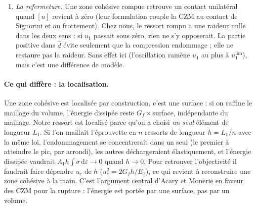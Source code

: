 \documentclass[11pt,a4paper]{article}
\newcommand{\dd}{\mathrm{d}}
\newcommand{\uc}{u_c}
\begin{document}
\begin{enumerate}[nosep]
        intrinsèques sont moins stables que les extrinsèques, parce que la décharge élastique
        du volume s'ajoute à l'adoucissement de l'interface. Notre ressort est donc \emph{plus}
        sujet au snap-back qu'une zone cohésive extrinsèque de mêmes paramètres.
  \item \emph{La refermeture.} Une zone cohésive rompue retrouve un contact unilatéral quand
        $[u]$ revient à zéro (leur formulation couple la CZM au contact de Signorini et au
        frottement). Chez nous, le ressort rompu a une raideur nulle dans les deux sens : si
        $u_1$ passait sous zéro, rien ne s'y opposerait. La partie positive dans $\hat d$ évite
        seulement que la compression endommage ; elle ne restaure pas la raideur. Sans effet
        ici (l'oscillation ramène $u_1$ au plus à $u_1^{\lim}$), mais c'est une différence de
        modèle.
\end{enumerate}

\paragraph{Ce qui diffère : la localisation.} Une zone cohésive est localisée par
construction, c'est une surface : si on raffine le maillage du volume, l'énergie dissipée
reste $G_f\times$surface, indépendante du maillage. Notre ressort est localisé parce qu'on a
choisi \emph{un seul} élément de longueur $L_1$. Si l'on maillait l'éprouvette en $n$
ressorts de longueur $h = L_1/n$ avec la même loi, l'endommagement se concentrerait dans un
seul (le premier à atteindre le pic, par arrondi), les autres déchargeraient élastiquement,
et l'énergie dissipée vaudrait $A_1h\int\sigma\,\dd\varepsilon \to 0$ quand $h\to0$. Pour retrouver
l'objectivité il faudrait faire dépendre $\uc$ de $h$ ($\uc^2 = 2G_fh/E_1$), ce qui revient à
reconstruire une zone cohésive à la main. C'est l'argument central d'Acary et Monerie en
faveur des CZM pour la rupture : l'énergie est portée par une surface, pas par un volume.
\end{document}

